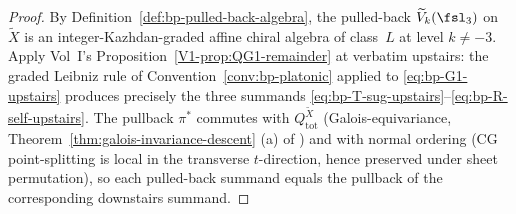 \begin{proof}
By Definition~\ref{def:bp-pulled-back-algebra}, the pulled-back
$\widetilde V_k(\fsl_3)$ on~$\widetilde X$ is an integer-Kazhdan-graded
affine chiral algebra of class~$L$ at level $k \ne -3$. Apply
Vol~I's
Proposition~\ref{V1-prop:QG1-remainder} at
\cite[\S\ref*{V1-sec:G1}]{Vol1-class-L-antighost}
verbatim upstairs: the graded Leibniz rule of
Convention~\ref{conv:bp-platonic} applied to
\eqref{eq:bp-G1-upstairs} produces precisely the three summands
\eqref{eq:bp-T-sug-upstairs}--\eqref{eq:bp-R-self-upstairs}. The
pullback $\pi^{\ast}$ commutes with $Q_{\mathrm{tot}}^{\widetilde X}$
(Galois-equivariance, Theorem~\ref{thm:galois-invariance-descent} (a)
of \cite[\S\ref*{subsec:galois-descent}]{Vol2-fractional-ghost-platonic})
and with normal ordering (CG point-splitting is local in the
transverse $t$-direction, hence preserved under sheet
permutation), so each pulled-back summand equals the pullback of
the corresponding downstairs summand.
\end{proof}

